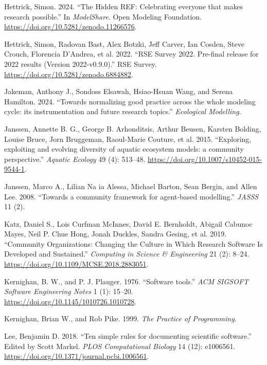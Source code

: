 \documentclass[preprint,11pt,5p]{elsarticle}
\newlength{\cslhangindent}
\newenvironment{CSLReferences}[2] %
{\begin{list}{}{%
	\setlength{\itemindent}{0pt}
	\setlength{\leftmargin}{0pt}
	\setlength{\parsep}{0pt}
	\ifodd #1
	\setlength{\leftmargin}{\cslhangindent}
	\setlength{\itemindent}{-1\cslhangindent}
	\fi
	\setlength{\itemsep}{#2\baselineskip}}}
{\end{list}}
\begin{document}
\begin{CSLReferences}{1}{0}
Hettrick, Simon. 2024. {``{The Hidden REF: Celebrating everyone that
makes research possible}.''} In \emph{ModelShare}. Open Modeling
Foundation. \url{https://doi.org/10.5281/zenodo.11266576}.

Hettrick, Simon, Radovan Bast, Alex Botzki, Jeff Carver, Ian Cosden,
Steve Crouch, Florencia D'Andrea, et al. 2022. {``{RSE Survey 2022.
Pre-final release for 2022 results (Version 2022-v0.9.0)}.''} RSE
Survey. \url{https://doi.org/10.5281/zenodo.6884882}.

Jakeman, Anthony J., Sondoss Elsawah, Hsiao-Hsuan Wang, and Serena
Hamilton. 2024. {``{Towards normalizing good practice across the whole
modeling cycle: its instrumentation and future research topics}.''}
\emph{Ecological Modelling}.

Janssen, Annette B. G., George B. Arhonditsis, Arthur Beusen, Karsten
Bolding, Louise Bruce, Jorn Bruggeman, Raoul-Marie Couture, et al. 2015.
{``{Exploring, exploiting and evolving diversity of aquatic ecosystem
models: a community perspective}.''} \emph{Aquatic Ecology} 49 (4):
513--48. \url{https://doi.org/10.1007/s10452-015-9544-1}.

Janssen, Marco A., Lilian Na ia Alessa, Michael Barton, Sean Bergin, and
Allen Lee. 2008. {``{Towards a community framework for agent-based
modelling}.''} \emph{JASSS} 11 (2).

Katz, Daniel S., Lois Curfman McInnes, David E. Bernholdt, Abigail
Cabunoc Mayes, Neil P. Chue Hong, Jonah Duckles, Sandra Gesing, et al.
2019. {``{Community Organizations: Changing the Culture in Which
Research Software Is Developed and Sustained}.''} \emph{Computing in
Science {\&} Engineering} 21 (2): 8--24.
\url{https://doi.org/10.1109/MCSE.2018.2883051}.

Kernighan, B. W., and P. J. Plauger. 1976. {``{Software tools}.''}
\emph{ACM SIGSOFT Software Engineering Notes} 1 (1): 15--20.
\url{https://doi.org/10.1145/1010726.1010728}.

Kernighan, Brian W., and Rob Pike. 1999. \emph{{The Practice of
Programming}}.

Lee, Benjamin D. 2018. {``{Ten simple rules for documenting scientific
software}.''} Edited by Scott Markel. \emph{PLOS Computational Biology}
14 (12): e1006561. \url{https://doi.org/10.1371/journal.pcbi.1006561}.


\end{CSLReferences}
\end{document}

